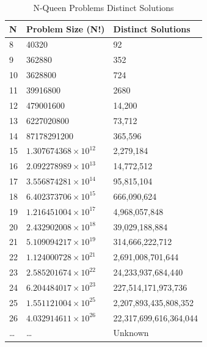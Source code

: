 \documentclass[conference]{IEEEtran}
\begin{document}
% 
%
\begin{table}
\centering
\caption{N-Queen Problems Distinct Solutions}
\begin{tabular}{|l|l|l|} \hline
N  & Problem Size (N!)      & Distinct Solutions      \\ \hline
8  & 40320                      & 92                     \\
9  & 362880                     & 352                    \\
10 & 3628800                    & 724                    \\
11 & 39916800                   & 2680                   \\
12 & 479001600                  & 14,200                 \\
13 & 6227020800                 & 73,712                 \\
14 & 87178291200                & 365,596                \\
15 & $1.307674368\times10^{12}$ & 2,279,184              \\
16 & $2.092278989\times10^{13}$ & 14,772,512             \\
17 & $3.556874281\times10^{14}$ & 95,815,104             \\
18 & $6.402373706\times10^{15}$ & 666,090,624            \\
19 & $1.216451004\times10^{17}$ & 4,968,057,848          \\
20 & $2.432902008\times10^{18}$ & 39,029,188,884         \\
21 & $5.109094217\times10^{19}$ & 314,666,222,712        \\
22 & $1.124000728\times10^{21}$ & 2,691,008,701,644      \\
23 & $2.585201674\times10^{22}$ & 24,233,937,684,440     \\
24 & $6.204484017\times10^{23}$ & 227,514,171,973,736    \\
25 & $1.551121004\times10^{25}$ & 2,207,893,435,808,352  \\
26 & $4.032914611\times10^{26}$ & 22,317,699,616,364,044 \\
\dots & \dots & Unknown				\\
\hline\end{tabular}
\label{table:numuniquesol}
\end{table}
\end{document}
